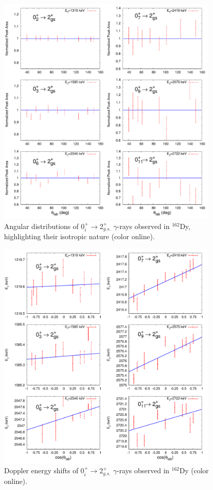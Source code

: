 \begin{figure}[h!]
\begin{center}
\includegraphics[width=0.95\textwidth]{figures/162Dy_0s_AD.pdf}
\caption{Angular distributions of 0$^+_i\rightarrow$2$^+_{g.s.}$ $\gamma$-rays observed in $^{162}$Dy, highlighting their isotropic nature (color online). \label{fig:162Dy_0s_AD}}
\end{center}
\end{figure}

\begin{figure}[h!]
\begin{center}
\includegraphics[width=0.95\textwidth]{figures/162Dy_0s_FT.pdf}
\caption{Doppler energy shifts of 0$^+_i\rightarrow$2$^+_{g.s.}$ $\gamma$-rays observed in $^{162}$Dy (color online). \label{fig:162Dy_0s_FT}}
\end{center}
\end{figure}

